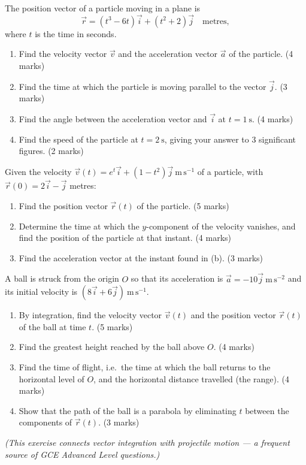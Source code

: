 \documentclass[11pt]{article}
\begin{document}
\begin{exercice}
The position vector of a particle moving in a plane is
\[ \vec{r} = (t^3 - 6t)\vec{i} + (t^2 + 2)\vec{j} \quad \text{metres}, \]
where $t$ is the time in seconds.
\begin{enumerate}
\item[(a)] Find the velocity vector $\vec{v}$ and the acceleration vector $\vec{a}$ of the particle. \hfill (4 marks)
\item[(b)] Find the time at which the particle is moving parallel to the vector $\vec{j}$. \hfill (3 marks)
\item[(c)] Find the angle between the acceleration vector and $\vec{i}$ at $t = 1\ \mathrm{s}$. \hfill (4 marks)
\item[(d)] Find the speed of the particle at $t = 2\ \mathrm{s}$, giving your answer to 3 significant figures. \hfill (2 marks)
\end{enumerate}
\end{exercice}

\begin{exercice}
Given the velocity $\vec{v}(t) = e^{t}\vec{i} + (1 - t^2)\vec{j}\ \mathrm{m\,s^{-1}}$ of a particle, with $\vec{r}(0) = 2\vec{i} - \vec{j}$ metres:
\begin{enumerate}
\item[(a)] Find the position vector $\vec{r}(t)$ of the particle. \hfill (5 marks)
\item[(b)] Determine the time at which the $y$-component of the velocity vanishes, and find the position of the particle at that instant. \hfill (4 marks)
\item[(c)] Find the acceleration vector at the instant found in (b). \hfill (3 marks)
\end{enumerate}
\end{exercice}

\begin{exercice}
A ball is struck from the origin $O$ so that its acceleration is $\vec{a} = -10\vec{j}\ \mathrm{m\,s^{-2}}$ and its initial velocity is $(8\vec{i} + 6\vec{j})\ \mathrm{m\,s^{-1}}$.
\begin{enumerate}
\item[(a)] By integration, find the velocity vector $\vec{v}(t)$ and the position vector $\vec{r}(t)$ of the ball at time $t$. \hfill (5 marks)
\item[(b)] Find the greatest height reached by the ball above $O$. \hfill (4 marks)
\item[(c)] Find the time of flight, i.e.\ the time at which the ball returns to the horizontal level of $O$, and the horizontal distance travelled (the range). \hfill (4 marks)
\item[(d)] Show that the path of the ball is a parabola by eliminating $t$ between the components of $\vec{r}(t)$. \hfill (3 marks)
\end{enumerate}
\emph{(This exercise connects vector integration with projectile motion — a frequent source of GCE Advanced Level questions.)}
\end{exercice}
\end{document}
